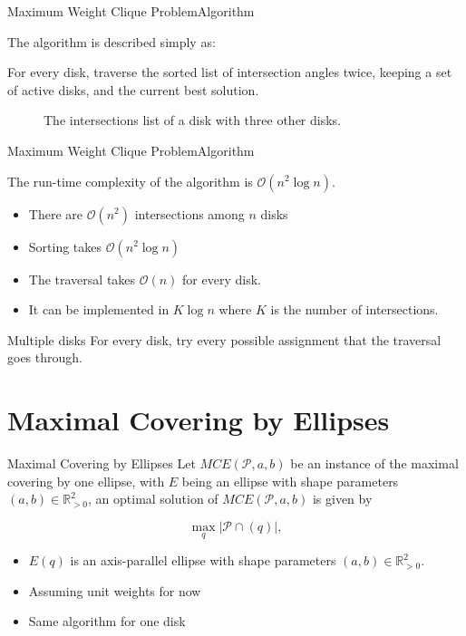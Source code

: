 \documentclass{beamer}
\newcommand{\R}{\mathbb{R}}
\newcommand{\Pp}{\mathscr{P}}
\newcommand{\bigO}{\mathscr{O}}
\begin{document}
\begin{frame}{Maximum Weight Clique Problem}{Algorithm}
	
	The algorithm is described simply as:
	
	For every disk, traverse the sorted list of intersection angles twice, keeping a set of active disks, and the current best solution.
	
\begin{figure}[H]
	\centering
	
	\caption{The intersections list of a disk with three other disks.}
	
	\label{fig:array_disks}
\end{figure}
\end{frame}


\begin{frame}{Maximum Weight Clique Problem}{Algorithm}
	
	The run-time complexity of the algorithm is $\bigO(n^2\log{n})$.
	
	\begin{itemize}
		\item There are $\bigO(n^2)$ intersections among $n$ disks
		
		\item Sorting takes $\bigO(n^2\log{n})$
		
		\item The traversal takes $\bigO(n)$ for every disk.
		
		\item It can be implemented in $K\log{n}$ where $K$ is the number of intersections. 
	\end{itemize}

\begin{block}{Multiple disks}
	For every disk, try every possible assignment that the traversal goes through.
\end{block}
	

	
	
\end{frame}

\section{Maximal Covering by Ellipses}

\begin{frame}{Maximal Covering by Ellipses}
	Let $MCE(\Pp, a, b)$ be an instance of the maximal covering by one ellipse, with $E$ being an ellipse with shape parameters $(a,b) \in \R_{>0}^2$, an optimal solution of $MCE(\Pp, a, b)$ is given by
	
	\begin{equation*}
	\max_q |\Pp \cap (q)|,
	\end{equation*}

	\begin{itemize}
		\item $E(q)$ is an axis-parallel ellipse with shape parameters $(a,b) \in \R^2_{>0}$.
		\item Assuming unit weights for now
		\item Same algorithm for one disk
	\end{itemize}

\end{frame}
\end{document}
